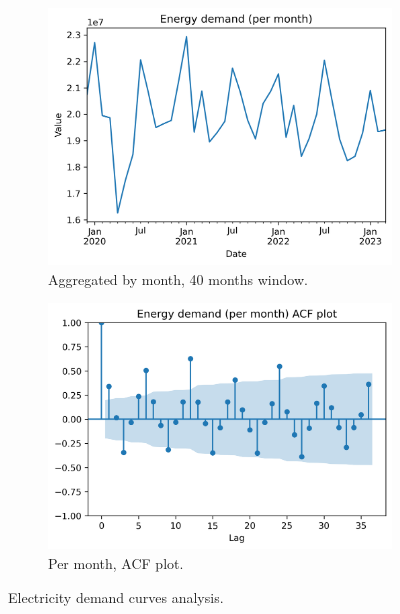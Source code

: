 \begin{figure}[H]\ContinuedFloat
    \begin{subfigure}{.43\textwidth}
        \centering
        \includegraphics[width=1\linewidth]{images/variable_analysis/esios_demand_m_40}
        \caption{Aggregated by month, 40 months window.}
        \label{fig:demand-series-month}
    \end{subfigure}
    \begin{subfigure}{.45\textwidth}
        \centering
        \includegraphics[width=1\linewidth]{images/variable_analysis/esios_demand_m_acf}
        \caption{Per month, ACF plot.}
        \label{fig:demand-series-month-acf}
    \end{subfigure}
    \caption{Electricity demand curves analysis.}
    \label{fig:demand-series}
\end{figure}

